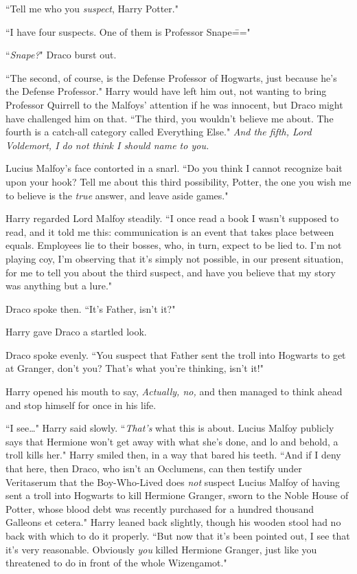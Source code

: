 ``Tell me who you \emph{suspect}, Harry Potter."

``I have four suspects. One of them is Professor Snape\==="

``\emph{Snape?}" Draco burst out.

``The second, of course, is the Defense Professor of Hogwarts, just because he's the Defense Professor." Harry would have left him out, not wanting to bring Professor Quirrell to the Malfoys' attention if he was innocent, but Draco might have challenged him on that. ``The third, you wouldn't believe me about. The fourth is a catch-all category called Everything Else." \emph{And the fifth, Lord Voldemort, I do not think I should name to you.}

Lucius Malfoy's face contorted in a snarl. ``Do you think I cannot recognize bait upon your hook? Tell me about this third possibility, Potter, the one you wish me to believe is the \emph{true} answer, and leave aside games."

Harry regarded Lord Malfoy steadily. ``I once read a book I wasn't supposed to read, and it told me this: communication is an event that takes place between equals. Employees lie to their bosses, who, in turn, expect to be lied to. I'm not playing coy, I'm observing that it's simply not possible, in our present situation, for me to tell you about the third suspect, and have you believe that my story was anything but a lure."

Draco spoke then. ``It's Father, isn't it?"

Harry gave Draco a startled look.

Draco spoke evenly. ``You suspect that Father sent the troll into Hogwarts to get at Granger, don't you? That's what you're thinking, isn't it!"

Harry opened his mouth to say, \emph{Actually, no,} and then managed to think ahead and stop himself for once in his life.

``I see{\ldots}" Harry said slowly. ``\emph{That's} what this is about. Lucius Malfoy publicly says that Hermione won't get away with what she's done, and lo and behold, a troll kills her." Harry smiled then, in a way that bared his teeth. ``And if I deny that here, then Draco, who isn't an Occlumens, can then testify under Veritaserum that the Boy-Who-Lived does \emph{not} suspect Lucius Malfoy of having sent a troll into Hogwarts to kill Hermione Granger, sworn to the Noble House of Potter, whose blood debt was recently purchased for a hundred thousand Galleons et cetera." Harry leaned back slightly, though his wooden stool had no back with which to do it properly. ``But now that it's been pointed out, I see that it's very reasonable. Obviously \emph{you} killed Hermione Granger, just like you threatened to do in front of the whole Wizengamot."

